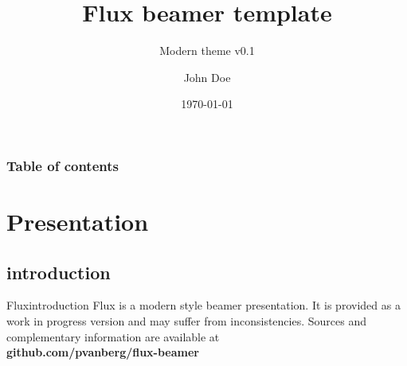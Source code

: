 \documentclass{beamer}
\title{Flux beamer template}
\subtitle{Modern theme v0.1}
\author{John Doe}
\institute{Institute, location}
\date{\today}
\begin{document}
\titlepage

\begin{frame}
 \frametitle{Table of contents}
 \tableofcontents
\end{frame}

\section{Presentation}

\subsection{introduction}

\begin{frame}{Flux}{introduction}
	\justifying
 Flux is a modern style beamer presentation. It is provided as a work in progress version and may suffer from inconsistencies. Sources and complementary information are available at\\[0.3cm]
 	\centering\textbf{github.com/pvanberg/flux-beamer}
\end{frame}
\end{document}
